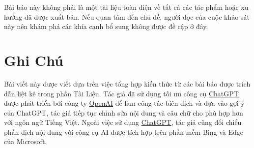 \documentclass[utf8]{frontiersSCNS} %
\begin{document}
Bài báo này không phải là một tài liệu toàn diện về tất cả các tác phẩm hoặc xu hướng đã được xuất bản. Nếu quan tâm đến chủ đề, người đọc của cuộc khảo sát này nên khám phá các khía cạnh bổ sung không được đề cập ở đây.






\section*{Ghi Chú}
Bài viết này được viết dựa trên việc tổng hợp kiến thức từ các bài báo được trích dẫn liệt kê trong phần Tài Liệu. Tác giả đã sử dụng tối ưu công cụ \href{https://chat.openai.com/chat}{ChatGPT} được phát triển bởi công ty \href{www.openai.com}{OpenAI} để làm công tác biên dịch và dựa vào gợi ý của ChatGPT, tác giả tiếp tục chỉnh sửa nội dung và câu chữ cho phù hợp hơn với ngôn ngữ Tiếng Việt. Ngoài việc sử dụng  \href{https://chat.openai.com/chat}{ChatGPT}, tác giả cũng đối chiếu phần dịch nội dung với công cụ AI được tích hợp trên phần mềm Bing và Edge của Microsoft. 









\end{document}
